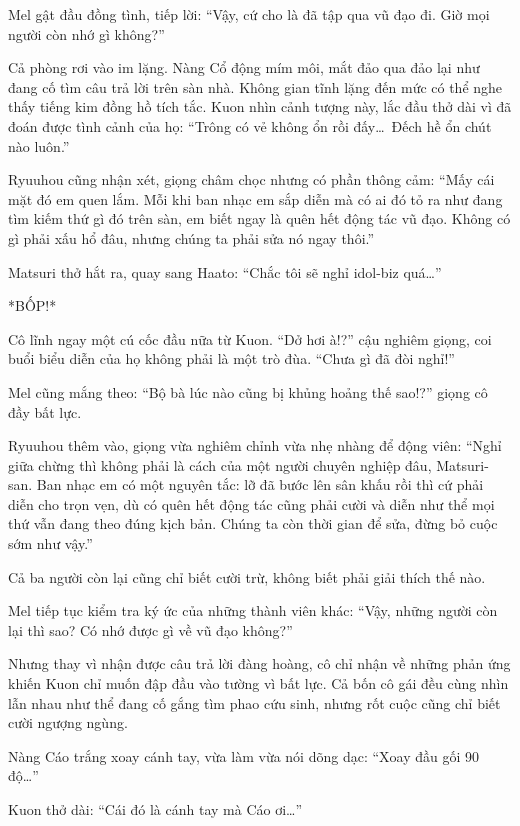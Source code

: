 \documentclass[../main.tex]{subfiles}
\begin{document}
Mel gật đầu đồng tình, tiếp lời: ``Vậy, cứ cho là đã tập qua vũ đạo đi. Giờ mọi người còn nhớ gì không?''

Cả phòng rơi vào im lặng. Nàng Cổ động mím môi, mắt đảo qua đảo lại như đang cố tìm câu trả lời trên sàn nhà. Không gian tĩnh lặng đến mức có thể nghe thấy tiếng kim đồng hồ tích tắc. Kuon nhìn cảnh tượng này, lắc đầu thở dài vì đã đoán được tình cảnh của họ: ``Trông có vẻ không ổn rồi đấy\dots\ Đếch hề ổn chút nào luôn.''

Ryuuhou cũng nhận xét, giọng châm chọc nhưng có phần thông cảm: ``Mấy cái mặt đó em quen lắm. Mỗi khi ban nhạc em sắp diễn mà có ai đó tỏ ra như đang tìm kiếm thứ gì đó trên sàn, em biết ngay là quên hết động tác vũ đạo. Không có gì phải xấu hổ đâu, nhưng chúng ta phải sửa nó ngay thôi.''

Matsuri thở hắt ra, quay sang Haato: ``Chắc tôi sẽ nghỉ idol-biz quá\dots''

*BỐP!*

Cô lĩnh ngay một cú cốc đầu nữa từ Kuon. ``Dở hơi à!?'' cậu nghiêm giọng, coi buổi biểu diễn của họ không phải là một trò đùa. ``Chưa gì đã đòi nghỉ!''

Mel cũng mắng theo: ``Bộ bà lúc nào cũng bị khủng hoảng thế sao!?'' giọng cô đầy bất lực.

Ryuuhou thêm vào, giọng vừa nghiêm chỉnh vừa nhẹ nhàng để động viên: ``Nghỉ giữa chừng thì không phải là cách của một người chuyên nghiệp đâu, Matsuri-san. Ban nhạc em có một nguyên tắc: lỡ đã bước lên sân khấu rồi thì cứ phải diễn cho trọn vẹn, dù có quên hết động tác cũng phải cười và diễn như thể mọi thứ vẫn đang theo đúng kịch bản. Chúng ta còn thời gian để sửa, đừng bỏ cuộc sớm như vậy.''

Cả ba người còn lại cũng chỉ biết cười trừ, không biết phải giải thích thế nào.

Mel tiếp tục kiểm tra ký ức của những thành viên khác: ``Vậy, những người còn lại thì sao? Có nhớ được gì về vũ đạo không?''

Nhưng thay vì nhận được câu trả lời đàng hoàng, cô chỉ nhận về những phản ứng khiến Kuon chỉ muốn đập đầu vào tường vì bất lực. Cả bốn cô gái đều cùng nhìn lẫn nhau như thể đang cố gắng tìm phao cứu sinh, nhưng rốt cuộc cũng chỉ biết cười ngượng ngùng.


Nàng Cáo trắng xoay cánh tay, vừa làm vừa nói dõng dạc: ``Xoay đầu gối 90 độ\dots''

Kuon thở dài: ``Cái đó là cánh tay mà Cáo ơi\dots''
\end{document}
